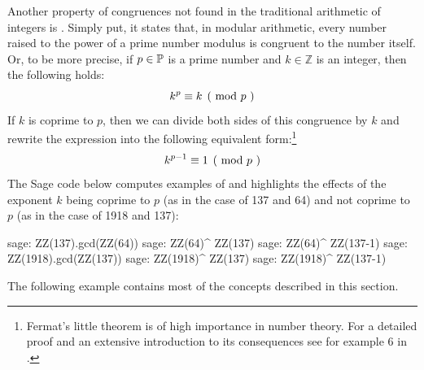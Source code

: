Another property of congruences not found in the traditional arithmetic of integers is . Simply put, it states that, in modular arithmetic, every number raised to the power of a prime number modulus is congruent to the number itself. Or, to be more precise, if $ p \in \mathbb{P} $ is a prime number and $ k \in \mathbb{Z} $ is an integer, then the following holds:
\begin{equation}\label{fermats-little-theorem}
\kongru{k ^ p}{k}{p} 
\end{equation}
If $k$ is coprime to $p$, then we can divide both sides of this congruence by $k$ and rewrite the expression into the following equivalent form:\footnote{Fermat’s little theorem is of high importance in number theory. For a detailed proof and an extensive introduction to its consequences see for example \chaptname{} 6 in \cite{hardy-2008}.}
\begin{equation}
\label{eq_fermat_lt_2}
\kongru{k ^{p-1}}{1}{p}
\end{equation}
The  Sage code below computes examples of  and highlights the effects of the exponent $k$ being coprime to $p$ (as in the case of 137 and 64) and not coprime to $p$ (as in the case of 1918 and 137):
\begin{sagecommandline}
sage: ZZ(137).gcd(ZZ(64))
sage: ZZ(64)^ ZZ(137) %
sage: ZZ(64)^ ZZ(137-1) %
sage: ZZ(1918).gcd(ZZ(137))
sage: ZZ(1918)^ ZZ(137) %
sage: ZZ(1918)^ ZZ(137-1) %
\end{sagecommandline}

The following example  contains most of the concepts described in this section.

